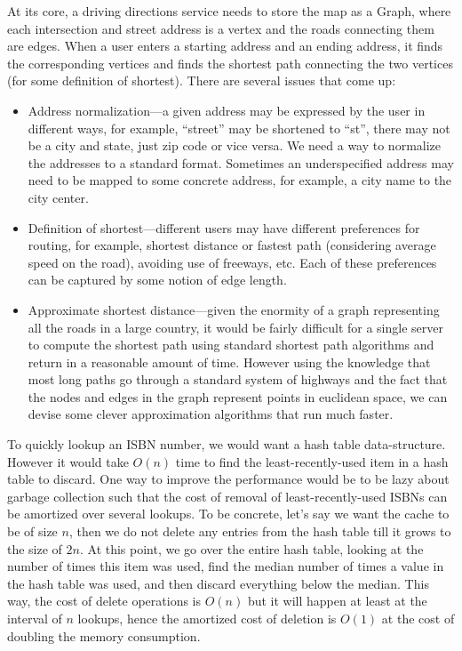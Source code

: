 At its core, a driving directions service needs to store the map as a
Graph, where each intersection and street address is a vertex and the
roads connecting them are edges. When a user enters a starting
address and an ending address, it finds the corresponding vertices and
finds the shortest path connecting the two vertices (for some definition of shortest). There are several issues that come up:
\begin{itemize}
\itemsep 1pt

\item Address normalization---a given address may be expressed by
  the user in different ways, for example, ``street'' may be shortened
  to ``st'', there may not be a city and state, just zip code or vice
  versa. We need a way to normalize the addresses to a standard
  format. Sometimes an underspecified address may need to be mapped to
  some concrete address, for example, a city name to the city center.
\item Definition of shortest---different users may have different
  preferences for routing, for example, shortest distance or fastest
  path (considering average speed on the road), avoiding use of freeways,
  etc. Each of these preferences can be captured by some notion of
  edge length.
\item Approximate shortest distance---given the enormity of a
  graph representing all the roads in a large country, it would be
  fairly difficult for a single server to compute the shortest path
  using standard shortest path algorithms and return in a reasonable
  amount of time. However using the knowledge that most long paths go
  through a standard system of highways and the fact that the nodes
  and edges in the graph represent points in euclidean space, we can
  devise some clever approximation algorithms that run much
  faster. 
\end{itemize}

To quickly lookup an ISBN number, we would want a hash table
data-structure. However it would take $O(n)$ time to find the least-recently-used item in a hash table to discard. One way to improve the
performance would be to be lazy about garbage collection such that the
cost of removal of least-recently-used ISBNs can be amortized over
several lookups. To be concrete, let's say we want the cache to be of
size $n$, then we do not delete any entries from the hash table till it
grows to the size of $2n$. At this point, we go over the entire
hash table, looking at the number of times this item was used,
find the median number of times a value in the hash table was used, and then
discard everything below the median. This way, the cost of delete
operations is $O(n)$ but it will happen at least at the interval of $n$
lookups, hence the amortized cost of deletion is $O(1)$ at the cost of
doubling the memory consumption.

